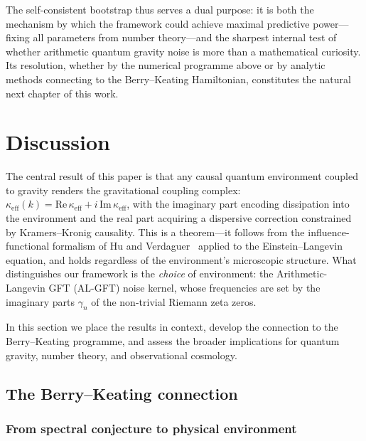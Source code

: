 \documentclass[12pt,a4paper]{article}
\begin{document}
\noindent
The self-consistent bootstrap thus serves a dual purpose:
it is both the mechanism by which the framework could achieve
maximal predictive power---fixing all parameters from number
theory---and the sharpest internal test of whether arithmetic
quantum gravity noise is more than a mathematical curiosity.
Its resolution, whether by the numerical programme above or
by analytic methods connecting to the Berry--Keating Hamiltonian,
constitutes the natural next chapter of this work.


\section{Discussion}
\label{sec:discussion}

The central result of this paper is that any causal quantum
environment coupled to gravity renders the gravitational
coupling complex:
$\kappa_{\mathrm{eff}}(k) = \mathrm{Re}\,\kappa_{\mathrm{eff}}
+ i\,\mathrm{Im}\,\kappa_{\mathrm{eff}}$,
with the imaginary part encoding dissipation into the environment
and the real part acquiring a dispersive correction constrained
by Kramers--Kronig causality.
This is a theorem---it follows from the influence-functional
formalism of Hu and Verdaguer~\cite{HuVerdaguer2004,HuVerdaguer2008}
applied to the Einstein--Langevin equation, and holds regardless
of the environment's microscopic structure.
What distinguishes our framework is the \emph{choice} of
environment: the Arithmetic-Langevin GFT (AL-GFT) noise kernel,
whose frequencies are set by the imaginary parts $\gamma_{n}$
of the non-trivial Riemann zeta zeros.

In this section we place the results in context, develop the
connection to the Berry--Keating programme, and assess the
broader implications for quantum gravity, number theory, and
observational cosmology.


\subsection{The Berry--Keating connection}
\label{subsec:BK-connection}

\subsubsection{From spectral conjecture to physical environment}
\end{document}
